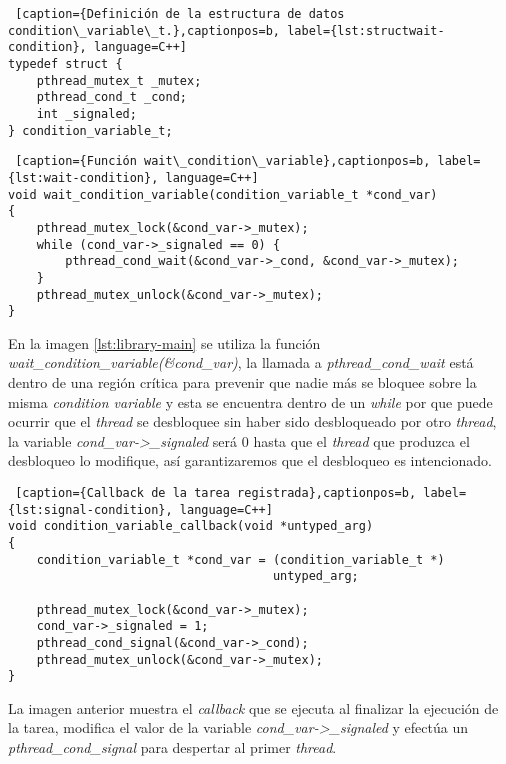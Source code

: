 \smallskip

\begin{lstlisting} [caption={Definición de la estructura de datos condition\_variable\_t.},captionpos=b, label={lst:structwait-condition}, language=C++]
typedef struct {
    pthread_mutex_t _mutex;
    pthread_cond_t _cond;
    int _signaled;
} condition_variable_t;
\end{lstlisting}

\smallskip

\begin{lstlisting} [caption={Función wait\_condition\_variable},captionpos=b, label={lst:wait-condition}, language=C++]
void wait_condition_variable(condition_variable_t *cond_var)
{
    pthread_mutex_lock(&cond_var->_mutex);
    while (cond_var->_signaled == 0) {
        pthread_cond_wait(&cond_var->_cond, &cond_var->_mutex);
    }
    pthread_mutex_unlock(&cond_var->_mutex);
}
\end{lstlisting}

En la imagen \ref{lst:library-main} se utiliza la función \textit{wait\_condition\_variable(\&cond\_var)}, la llamada a  \textit{pthread\_cond\_wait} está dentro de una región crítica para prevenir que nadie más se bloquee sobre la misma \textit{condition variable} y esta se encuentra dentro de un \textit{while} por que puede ocurrir que el \textit{thread} se desbloquee sin haber sido desbloqueado por otro \textit{thread}, la variable \textit{cond\_var->\_signaled} será 0 hasta que el \textit{thread} que produzca el desbloqueo lo modifique, así garantizaremos que el desbloqueo es intencionado.
\smallskip

\begin{lstlisting} [caption={Callback de la tarea registrada},captionpos=b, label={lst:signal-condition}, language=C++]
void condition_variable_callback(void *untyped_arg)
{
    condition_variable_t *cond_var = (condition_variable_t *) 
    								 untyped_arg;

    pthread_mutex_lock(&cond_var->_mutex);
    cond_var->_signaled = 1;
    pthread_cond_signal(&cond_var->_cond);
    pthread_mutex_unlock(&cond_var->_mutex);
}
\end{lstlisting}

La imagen anterior muestra el \textit{callback} que se ejecuta al finalizar la ejecución de la tarea, modifica el valor de la variable \textit{cond\_var->\_signaled} y efectúa un \textit{pthread\_cond\_signal} para despertar al primer \textit{thread}.

\bigskip

